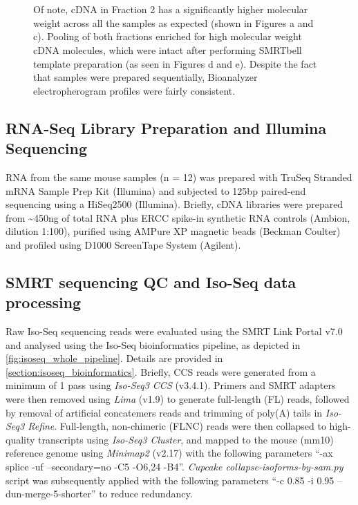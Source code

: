 \begin{figure}[!htp]
{	\\
	\\	 	
	Of note, cDNA in Fraction 2 has a significantly higher molecular weight across all the samples as expected (shown in Figures a and c). Pooling of both fractions enriched for high molecular weight cDNA molecules, which were intact after performing SMRTbell template preparation (as seen in Figures d and e). Despite the fact that samples were prepared sequentially, Bioanalyzer electropherogram profiles were fairly consistent. 
	}
	\label{fig:isoseq_whole_bioresults}
\end{figure}

\clearpage
\subsection{RNA-Seq Library Preparation and Illumina Sequencing}
RNA from the same mouse samples (n = 12) was prepared with TruSeq Stranded mRNA Sample Prep Kit (Illumina) and subjected to 125bp paired-end sequencing using a HiSeq2500 (Illumina)\cite{Castanho2020}. Briefly, cDNA libraries were prepared from \textasciitilde450ng of total RNA plus ERCC spike-in synthetic RNA controls (Ambion, dilution 1:100), purified using AMPure XP magnetic beads (Beckman Coulter) and profiled using D1000 ScreenTape System (Agilent). 

\subsection{SMRT sequencing QC and Iso-Seq data processing}\label{ch4_methods: isoseq_data}
Raw Iso-Seq sequencing reads were evaluated using the SMRT Link Portal v7.0 and analysed using the Iso-Seq bioinformatics pipeline, as depicted in \cref{fig:isoseq_whole_pipeline}. Details are provided in \cref{section:isoseq_bioinformatics}. Briefly, CCS reads were generated from a minimum of 1 pass using \textit{Iso-Seq3 CCS} (v3.4.1). Primers and SMRT adapters were then removed using \textit{Lima} (v1.9) to generate full-length (FL) reads, followed by removal of artificial concatemers reads and trimming of poly(A) tails in \textit{Iso-Seq3 Refine}. Full-length, non-chimeric (FLNC) reads were then collapsed to high-quality transcripts using \textit{Iso-Seq3 Cluster}, and mapped to the mouse (mm10) reference genome using \textit{Minimap2} (v2.17) with the following parameters “-ax splice -uf --secondary=no -C5 -O6,24 -B4”. \textit{ Cupcake collapse-isoforms-by-sam.py} script was subsequently applied with the following parameters  “-c 0.85 -i 0.95 --dun-merge-5-shorter” to reduce redundancy. 

